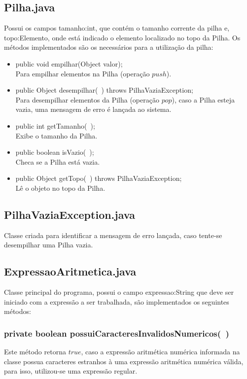 \documentclass[a4paper,11pt]{article}
\begin{document}
\subsection{Pilha.java}
Possui os campos tamanho:int, que contém o tamanho corrente da pilha e, topo:Elemento, onde está indicado o elemento localizado no topo da Pilha. Os métodos implementados são os necessários para a utilização da pilha: 
\begin{itemize}
  \item public void empilhar(Object valor);\\
Para empilhar elementos na Pilha (operação $push$).
  \item public Object desempilhar(\ ) throws PilhaVaziaException;\\Para desempilhar elementos da Pilha (operação $pop$), caso a Pilha esteja vazia, uma mensagem de erro é lançada ao sistema.
  \item public int getTamanho(\ );\\Exibe o tamanho da Pilha.
  \item public boolean isVazio(\ );\\Checa se a Pilha está vazia.
  \item public Object getTopo(\ ) throws PilhaVaziaException;\\Lê o objeto no topo da Pilha.
\end{itemize}

\subsection{PilhaVaziaException.java}
Classe criada para identificar a mensagem de erro lançada, caso tente-se desempilhar uma Pilha vazia.

\subsection{ExpressaoAritmetica.java}
Classe principal do programa, possui o campo expressao:String que deve ser iniciado com a expressão a ser trabalhada, são implementados os seguintes métodos:

\subsubsection{private boolean possuiCaracteresInvalidosNumericos(\ )}
Este método retorna  \emph{$true$}, caso a expressão aritmética numérica informada na classe possua caracteres estranhos à uma expressão aritmética numérica válida, para isso, utilizou-se uma expressão regular. 
\end{document}
